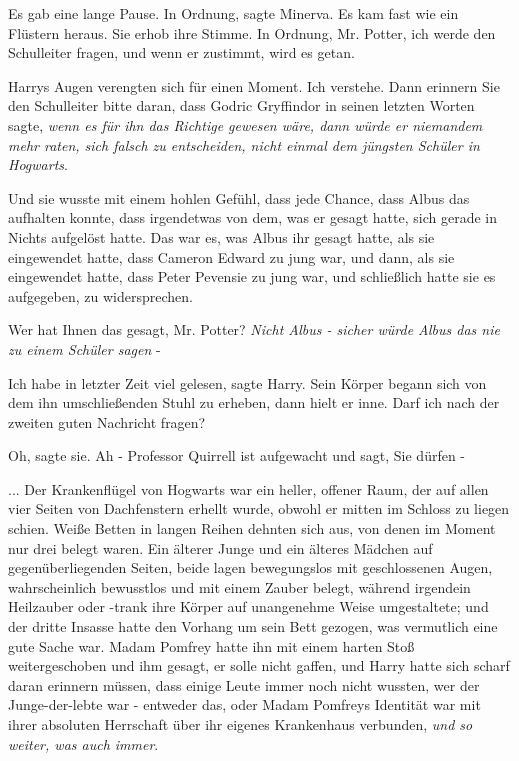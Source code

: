 Es gab eine lange Pause. \glqq In Ordnung\grqq{}, sagte Minerva. Es kam fast wie
ein Flüstern heraus. Sie erhob ihre Stimme. \glqq In Ordnung, Mr. Potter, ich
werde den Schulleiter fragen, und wenn er zustimmt, wird es getan.\grqq{}

Harrys Augen verengten sich für einen Moment. \glqq Ich verstehe. Dann erinnern
Sie den Schulleiter bitte daran, dass Godric Gryffindor in seinen letzten Worten
sagte, \emph{wenn es für ihn das Richtige gewesen wäre, dann würde er niemandem
mehr raten, sich falsch zu entscheiden, nicht einmal dem jüngsten Schüler in
Hogwarts}.\grqq{}

Und sie wusste mit einem hohlen Gefühl, dass jede Chance, dass Albus das
aufhalten konnte, dass irgendetwas von dem, was er gesagt hatte, sich gerade in
Nichts aufgelöst hatte. Das war es, was Albus ihr gesagt hatte, als sie
eingewendet hatte, dass Cameron Edward zu jung war, und dann, als sie
eingewendet hatte, dass Peter Pevensie zu jung war, und schließlich hatte sie es
aufgegeben, zu widersprechen.

\glqq Wer hat Ihnen das gesagt, Mr. Potter?\grqq{} \emph{Nicht Albus - sicher
würde Albus das nie zu einem Schüler sagen }-

\glqq Ich habe in letzter Zeit viel gelesen\grqq{}, sagte Harry. Sein Körper
begann sich von dem ihn umschließenden Stuhl zu erheben, dann hielt er inne.
\glqq Darf ich nach der zweiten guten Nachricht fragen?\grqq{}

\glqq Oh\grqq{}, sagte sie. \glqq Ah - Professor Quirrell ist aufgewacht und
sagt, Sie dürfen -\grqq{}

... Der Krankenflügel von Hogwarts war ein heller, offener Raum, der auf allen
vier Seiten von Dachfenstern erhellt wurde, obwohl er mitten im Schloss zu
liegen schien. Weiße Betten in langen Reihen dehnten sich aus, von denen im
Moment nur drei belegt waren. Ein älterer Junge und ein älteres Mädchen auf
gegenüberliegenden Seiten, beide lagen bewegungslos mit geschlossenen Augen,
wahrscheinlich bewusstlos und mit einem Zauber belegt, während irgendein
Heilzauber oder -trank ihre Körper auf unangenehme Weise umgestaltete; und der
dritte Insasse hatte den Vorhang um sein Bett gezogen, was vermutlich eine gute
Sache war. Madam Pomfrey hatte ihn mit einem harten Stoß weitergeschoben und ihm
gesagt, er solle nicht gaffen, und Harry hatte sich scharf daran erinnern
müssen, dass einige Leute immer noch nicht wussten, wer der Junge-der-lebte war
- entweder das, oder Madam Pomfreys Identität war mit ihrer absoluten Herrschaft
über ihr eigenes Krankenhaus verbunden, \emph{und so weiter, was auch immer}.

